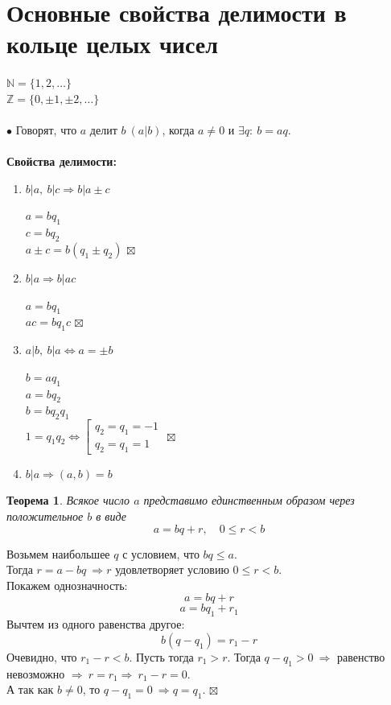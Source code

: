 \documentclass[a4paper, 12pt]{article}
\newtheorem*{theorem}{Теорема}
\newenvironment{Proof}
{\par\noindent{$\blacklozenge$}}
{\hfill$\scriptstyle\boxtimes$}
\newcommand{\N}{\mathbb{N}}
\newcommand{\Z}{\mathbb{Z}}
\begin{document}
    \section{Основные свойства делимости в кольце целых чисел}
    $\N = \{ 1, 2, \dots \}$\\
    $\Z = \{ 0, \pm 1, \pm 2, \dots \}$\\\\
    $\bullet$ Говорят, что $a$ делит $b \ (a | b)$, когда $a \neq 0$ и $\exists q: \ b=aq$.\\\\
    \textbf{Свойства делимости:}
    \begin{enumerate}
        \item $b|a, \ b|c \Rightarrow b|a\pm c$
        \begin{Proof}
        $a=bq_1$\\
        $c=bq_2$\\
        $a \pm c = b(q_1 \pm q_2)$
        \end{Proof}
        \item $b | a \Rightarrow b |ac$
        \begin{Proof}
        $a=bq_1$\\
        $ac=bq_1c$
        \end{Proof}
        \item $a|b, \ b|a \Leftrightarrow a= \pm b$
        \begin{Proof}
        $b=aq_1$\\
        $a=bq_2$\\
        $b=bq_2q_1$\\
        $1=q_1q_2 \Leftrightarrow \left[ 
        \begin{gathered}
            q_2=q_1=-1\\
            q_2=q_1=1
        \end{gathered} \right.$
        \end{Proof}
        \item $b |a \Rightarrow (a,b)=b$
    \end{enumerate}
    \begin{theorem}
        Всякое число $a$ представимо единственным образом через положительное $b$ в виде
        $$a=bq+r, \quad 0 \leq r < b$$
    \end{theorem}
    \begin{Proof}
    Возьмем наибольшее $q$ с условием, что $bq \leq a$.\\
    Тогда $r=a-bq \ \Rightarrow r$ удовлетворяет условию  $0 \leq r < b$.\\
    Покажем однозначность:\\
    $$a=bq+r$$
    $$a=bq_1+r_1$$
    Вычтем из одного равенства другое:
    $$b(q-q_1)=r_1-r$$
    Очевидно, что $r_1-r < b$. Пусть тогда $r_1>r$. Тогда $q-q_1>0 \ \Rightarrow$ равенство невозможно $\Rightarrow \ r=r_1 \Rightarrow \ r_1-r=0$.\\
    А так как $b \neq 0$, то $q-q_1=0 \ \Rightarrow q=q_1$.
    \end{Proof}
\end{document}
